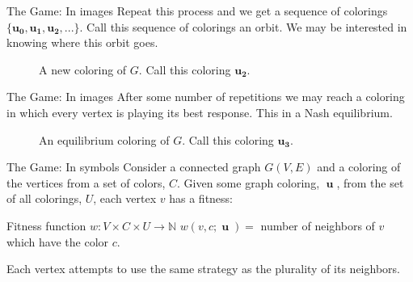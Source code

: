 \documentclass{beamer}
\DeclareMathOperator{\uu}{\mathbf{u}}
\begin{document}
\begin{frame}{The Game: In images}
	Repeat this process and we get a sequence of colorings $\{\mathbf{u_0},\mathbf{u_1},\mathbf{u_2},...\}$. Call this sequence of colorings an orbit. We may be interested in knowing where this orbit goes.
	
	\begin{figure}
		\caption{A new coloring of $G$. Call this coloring $\mathbf{u_2}$.}
	\end{figure}
\end{frame}

\begin{frame}{The Game: In images}
	After some number of repetitions we may reach a coloring in which every vertex is playing its best response. This in a Nash equilibrium.
	
	\begin{figure}
		\caption{An equilibrium coloring of $G$. Call this coloring $\mathbf{u_3}$.}
	\end{figure}
\end{frame}


\begin{frame}{The Game: In symbols}
	Consider a connected graph $G(V,E)$ and a coloring of the vertices from a set of colors, $C$. Given some graph coloring, $\uu$, from the set of all colorings, $U$, each vertex $v$ has a fitness:
	
	\begin{block}{Fitness function $w:V\times C\times U\rightarrow \mathbb{N}$}
		$w(v,c;\uu)=$ number of neighbors of $v$ which have the color $c$.
	\end{block}
	 
	 Each vertex attempts to use the same strategy as the plurality of its neighbors. 
\end{frame}
\end{document}
